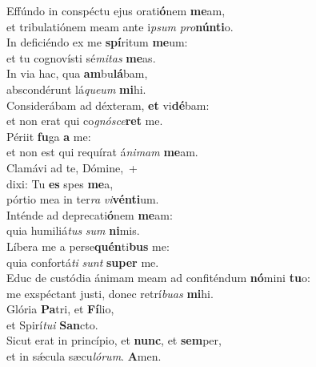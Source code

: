 \evenverse Effúndo in conspéctu ejus orati\textbf{ó}nem \textbf{me}am,~\*\\
\evenverse et tribulatiónem meam ante i\textit{psum} \textit{pro}\textbf{nún}\textbf{ti}o.\\
\oddverse In deficiéndo ex me \textbf{spí}ritum \textbf{me}um:~\*\\
\oddverse et tu cognovísti sé\textit{mi}\textit{tas} \textbf{me}as.\\
\evenverse In via hac, qua \textbf{am}bu\textbf{lá}bam,~\*\\
\evenverse abscondérunt lá\textit{que}\textit{um} \textbf{mi}hi.\\
\oddverse Considerábam ad déxteram, \textbf{et} vi\textbf{dé}bam:~\*\\
\oddverse et non erat qui co\textit{gnó}\textit{sce}\textbf{ret} me.\\
\evenverse Périit \textbf{fu}ga \textbf{a} me:~\*\\
\evenverse et non est qui requírat á\textit{ni}\textit{mam} \textbf{me}am.\\
\oddverse Clamávi ad te, Dómine,~+\\
\oddverse  dixi: Tu \textbf{es} spes \textbf{me}a,~\*\\
\oddverse pórtio mea in ter\textit{ra} \textit{vi}\textbf{vén}\textbf{ti}um.\\
\evenverse Inténde ad deprecati\textbf{ó}nem \textbf{me}am:~\*\\
\evenverse quia humiliá\textit{tus} \textit{sum} \textbf{ni}mis.\\
\oddverse Líbera me a perse\textbf{quén}ti\textbf{bus} me:~\*\\
\oddverse quia confortá\textit{ti} \textit{sunt} \textbf{su}\textbf{per} me.\\
\evenverse Educ de custódia ánimam meam ad confiténdum \textbf{nó}mini \textbf{tu}o:~\*\\
\evenverse me exspéctant justi, donec retrí\textit{bu}\textit{as} \textbf{mi}hi.\\
\oddverse Glória \textbf{Pa}tri, et \textbf{Fí}lio,~\*\\
\oddverse et Spirí\textit{tu}\textit{i} \textbf{San}cto.\\
\evenverse Sicut erat in princípio, et \textbf{nunc}, et \textbf{sem}per,~\*\\
\evenverse et in sǽcula sæcu\textit{ló}\textit{rum}. \textbf{A}men.\\
